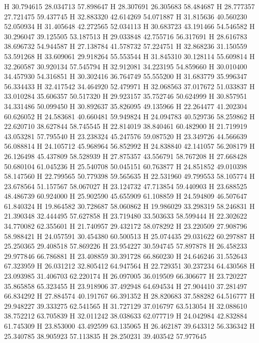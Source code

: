 \documentclass{article}
\begin{document}
H 30.794615 28.034713 57.898647 
H 28.307691 26.305683 58.484687 
H 28.777357 27.721475 59.437745 
H 32.883320 42.614269 54.071887 
H 31.815636 40.560230 52.050934 
H 31.405648 42.272565 52.034113 
H 30.683723 43.191466 54.546582 
H 30.296047 39.125505 53.187513 
H 29.033848 42.755716 56.317691 
H 28.616783 38.696732 54.944587 
H 27.138784 41.578732 57.224751 
H 32.868236 31.150559 53.591268 
H 33.609061 29.918264 55.553544 
H 31.845310 30.128114 55.609814 
H 32.260587 30.920134 57.545794 
H 32.912081 34.223195 54.859660 
H 30.010400 34.457930 54.316851 
H 30.302416 36.764749 55.555200 
H 31.683779 35.996347 56.334433 
H 32.417542 34.464920 52.479971 
H 32.068563 37.017672 51.033837 
H 33.010284 35.606357 50.517320 
H 29.923157 35.752746 50.624999 
H 30.857951 34.331486 50.099450 
H 30.892637 35.826095 49.135966 
H 22.264477 41.202304 60.626052 
H 24.583681 40.660481 59.949824 
H 24.094783 40.529736 58.259862 
H 22.620710 38.627844 58.745545 
H 22.814019 38.840461 60.482900 
H 21.719919 43.053281 57.795540 
H 23.238324 45.247576 59.087520 
H 23.349726 44.566639 56.088814 
H 24.105712 45.968964 56.852992 
H 24.838840 42.141057 56.208179 
H 26.126498 45.437809 58.528939 
H 27.875357 43.556791 58.767208 
H 27.668428 50.680104 61.045236 
H 25.540708 50.045151 60.763877 
H 24.851852 49.010398 58.147560 
H 22.799565 50.779398 59.565635 
H 22.531960 49.799553 58.105774 
H 23.678564 51.157567 58.067027 
H 23.124732 47.713854 59.440903 
H 23.688525 48.486739 60.924000 
H 25.902590 45.655909 61.108859 
H 24.594809 46.507647 61.840324 
H 19.864582 30.728687 58.060862 
H 19.986029 33.298319 58.246831 
H 21.390348 32.444495 57.627858 
H 23.719480 33.503633 58.599444 
H 22.302622 34.770082 62.355601 
H 21.740957 29.432172 58.078292 
H 23.220509 27.908796 58.988421 
H 24.057591 30.454380 60.500513 
H 25.074435 29.031622 60.297887 
H 25.250365 29.408518 57.869226 
H 23.954227 30.594745 57.897878 
H 26.458233 29.977846 66.786881 
H 23.408859 30.391728 66.860230 
H 24.646246 31.552643 67.323959 
H 26.031212 32.805412 64.947564 
H 22.729351 30.237234 64.430568 
H 23.093985 31.406703 62.220174 
H 26.097005 36.019509 66.306677 
H 23.720227 35.865858 65.323455 
H 23.918906 37.492948 64.694534 
H 27.904410 37.281497 66.834292 
H 27.884574 40.191767 66.391352 
H 28.820683 37.588282 64.516777 
H 29.948227 39.333275 62.541565 
H 31.727129 37.016797 63.513054 
H 32.088610 38.752212 63.705839 
H 32.011242 38.038633 62.077719 
H 24.042984 42.832884 61.745309 
H 23.853000 43.492599 63.135065 
H 26.462187 39.643312 56.336342 
H 25.340785 38.905923 57.113835 
H 28.250231 39.403542 57.977645 
\end{document}
